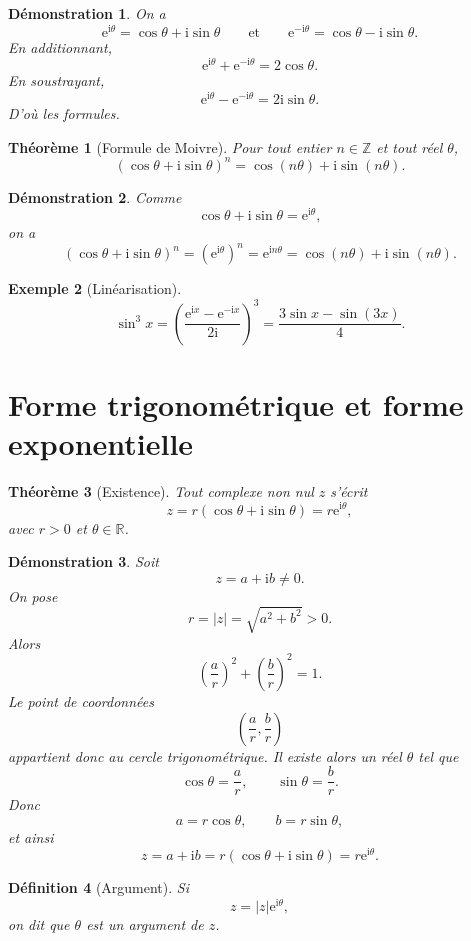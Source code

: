 \documentclass[11pt,a4paper]{article}
\newtheorem{definition}{Définition}[section]
\newtheorem{theoreme}[definition]{Théorème}
\newtheorem{exemple}[definition]{Exemple}
\newtheorem*{demonstration}{Démonstration}
\newcommand{\R}{\mathbb{R}}
\newcommand{\ii}{\mathrm{i}}
\newcommand{\e}{\mathrm{e}}
\begin{document}
\begin{demonstration}
On a
\[
\e^{\ii\theta}=\cos\theta+\ii\sin\theta
\qquad \text{et} \qquad
\e^{-\ii\theta}=\cos\theta-\ii\sin\theta.
\]
En additionnant,
\[
\e^{\ii\theta}+\e^{-\ii\theta}=2\cos\theta.
\]
En soustrayant,
\[
\e^{\ii\theta}-\e^{-\ii\theta}=2\ii\sin\theta.
\]
D'où les formules.
\end{demonstration}

\begin{theoreme}[Formule de Moivre]
Pour tout entier $n\in \mathbb{Z}$ et tout réel $\theta$,
\[
(\cos\theta+\ii\sin\theta)^n=\cos(n\theta)+\ii\sin(n\theta).
\]
\end{theoreme}

\begin{demonstration}
Comme
\[
\cos\theta+\ii\sin\theta=\e^{\ii\theta},
\]
on a
\[
(\cos\theta+\ii\sin\theta)^n=(\e^{\ii\theta})^n=\e^{\ii n\theta}
=\cos(n\theta)+\ii\sin(n\theta).
\]
\end{demonstration}

\begin{exemple}[Linéarisation]
\[
\sin^3 x
=\left(\frac{\e^{\ii x}-\e^{-\ii x}}{2\ii}\right)^3
=\frac{3\sin x-\sin(3x)}{4}.
\]
\end{exemple}

\section{Forme trigonométrique et forme exponentielle}

\begin{theoreme}[Existence]
Tout complexe non nul $z$ s'écrit
\[
z=r(\cos\theta+\ii\sin\theta)=r\e^{\ii\theta},
\]
avec $r>0$ et $\theta\in \R$.
\end{theoreme}

\begin{demonstration}
Soit
\[
z=a+\ii b\neq 0.
\]
On pose
\[
r=|z|=\sqrt{a^2+b^2}>0.
\]
Alors
\[
\left(\frac{a}{r}\right)^2+\left(\frac{b}{r}\right)^2=1.
\]
Le point de coordonnées
\[
\left(\frac{a}{r},\frac{b}{r}\right)
\]
appartient donc au cercle trigonométrique. Il existe alors un réel $\theta$ tel que
\[
\cos\theta=\frac{a}{r},
\qquad
\sin\theta=\frac{b}{r}.
\]
Donc
\[
a=r\cos\theta,\qquad b=r\sin\theta,
\]
et ainsi
\[
z=a+\ii b=r(\cos\theta+\ii\sin\theta)=r\e^{\ii\theta}.
\]
\end{demonstration}

\begin{definition}[Argument]
Si
\[
z=|z|\e^{\ii\theta},
\]
on dit que $\theta$ est un \emph{argument} de $z$.
\end{definition}
\end{document}
